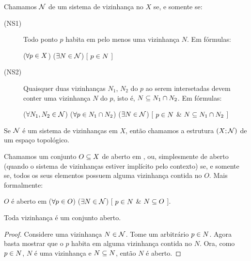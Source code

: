 \documentclass[a4paper,12pt,oneside]{book}
\begin{document}
\begin{definition}
	\label{def:sistema-de-vizinhanca}
	Chamamos $\mathcal{N}$ de um sistema de vizinhança no $X$ se, e somente se:
	\begin{description}
		\item[(NS1)]
		\label{def:sistema-de-vizinhanca1}
		Todo ponto $p$ habita em pelo menos uma vizinhança $N$. Em fórmulas:
		\begin{center}
			($\forall p \in X$)%
			($\exists N \in \mathcal{N}$)%
			[ $p \in N$ ]
		\end{center}

		\item[(NS2)]
		\label{def:sistema-de-vizinhanca2}
		Quaisquer duas vizinhanças $N_1$, $N_2$ do $p$ ao serem intersetadas devem conter uma vizinhança $N$ do $p$, isto é, $N \subseteq N_1 \cap N_2$. Em fórmulas:
		\begin{center}
			($\forall N_1, N_2 \in \mathcal{N}$)%
			($\forall p \in N_1 \cap N_2$)%
			($\exists N \in \mathcal{N}$)%
			[ $p \in N$ \& $N \subseteq N_1 \cap N_2$ ]
		\end{center}
	\end{description}
\end{definition}

\begin{definition}
	Se $\mathcal{N}$ é um sistema de vizinhanças em $X$, então chamamos a estrutura $(X;\mathcal{N})$ de um espaço topológico.
\end{definition}

\begin{definition}[Aberto]
	\label{def:aberto}
	Chamamos um conjunto $O \subseteq X$ de aberto em , ou, simplesmente de aberto (quando o sistema de vizinhanças estiver implícito pelo contexto) se, e somente se, todos os seus elementos possuem alguma vizinhança contida no $O$. Mais formalmente:
	\begin{center}
		$O$ é aberto em  \sse
			($\forall p \in O$)%
			($\exists N \in \mathcal{N}$)%
			[ $p \in N$ \& $N \subseteq O$ ].
	\end{center}
\end{definition}

\begin{fact}
	\label{vizinhanca-aberto}
	Toda vizinhança é um conjunto aberto.
\end{fact}

\begin{proof}
	Considere uma vizinhança $N \in \mathcal{N}$. Tome um arbitrário $p \in N$. Agora basta mostrar que o $p$ habita em alguma vizinhança contida no $N$. Ora, como $p \in N$, $N$ é uma vizinhança e $N \subseteq N$, então $N$ é aberto.
\end{proof}
\end{document}
